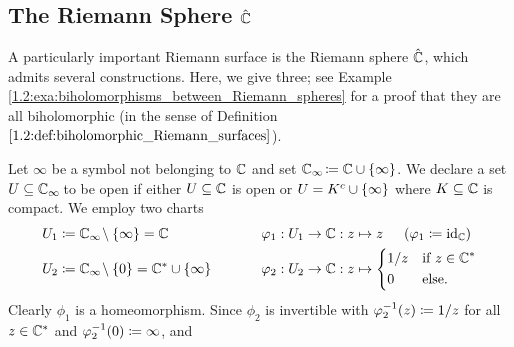 \documentclass[../Moduli_Spaces_of_Riemann_Surfaces.tex]{subfiles}
\begin{document}
    \subsection{The Riemann Sphere $\hat{\mathbb{C}}$}
    A particularly important Riemann surface is the Riemann sphere $\hat{\mathbb{C}}$, which admits several constructions. Here, we give three; see Example \ref{1.2:exa:biholomorphisms_between_Riemann_spheres} for a proof that they are all biholomorphic (in the sense of Definition $\ref{1.2:def:biholomorphic_Riemann_surfaces}$).
    \begin{example}\label{1.1:one_point_compactification_of_C}
        Let $\infty$ be a symbol not belonging to $\mathbb{C}$ and set $\mathbb{C}_\infty\!\coloneqq\mathbb{C}\cup\left\{\infty\right\}$. We declare a set $U\subseteq\mathbb{C}_\infty\!$ to be open if either $U\subseteq\mathbb{C}$ is open or $U=K^c\cup\left\{\infty\right\}$ where $K\subseteq\mathbb{C}$ is compact. We employ two charts
        \begin{equation*}
            \begin{alignedat}{2}
                U_1&\coloneqq\C_\infty\!\comp\l\{\infty\r\}=\C\ \ \ \ \ \ \ \ \ \ \ \ \ \ \ \ \ \ \ \ &&\phi_1:U_1\to\C:z\mapsto z\ \ \ \ \l(\phi_1\coloneqq\id_\C\r) \\
                U_2&\coloneqq\C_\infty\!\comp\l\{0\r\}=\C^\ast\cup\l\{\infty\r\}&&\phi_2:U_2\to\C:z\mapsto
                \begin{dcases}
                    1/z & \textrm{if }z\in\C^\ast \\
                    0 & \textrm{else.}
                \end{dcases}
            \end{alignedat}
        \end{equation*}
        Clearly $\phi_1$ is a homeomorphism. Since $\phi_2$ is invertible with $\varphi_2^{-1}\!\left(z\right)\coloneqq1/z$ for all $z\in\mathbb{C}^\ast$ and $\varphi_2^{-1}\!\left(0\right)\coloneqq\infty$, and

\end{example}
\end{document}
